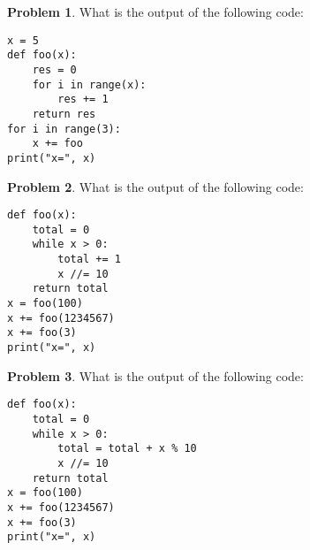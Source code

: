 \documentclass[10pt]{article}
\theoremstyle{definition}
\newtheorem{problem}{Problem}
\begin{document}
\newpage
\begin{problem}
    What is the output of the following code:
\end{problem}
\begin{lstlisting}
x = 5
def foo(x):
    res = 0
    for i in range(x):
        res += 1
    return res
for i in range(3):
    x += foo
print("x=", x)
\end{lstlisting}
\vspace{2in}


\begin{problem}
    What is the output of the following code:
\end{problem}
\begin{lstlisting}
def foo(x):
    total = 0
    while x > 0:
        total += 1
        x //= 10
    return total
x = foo(100)
x += foo(1234567)
x += foo(3)
print("x=", x)
\end{lstlisting}
\vspace{2in}

\newpage
\begin{problem}
    What is the output of the following code:
\end{problem}
\begin{lstlisting}
def foo(x):
    total = 0
    while x > 0:
        total = total + x % 10
        x //= 10
    return total
x = foo(100)
x += foo(1234567)
x += foo(3)
print("x=", x)
\end{lstlisting}
\vspace{2in}
\end{document}
